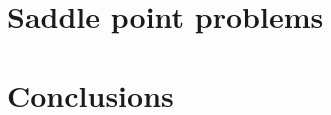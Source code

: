\documentclass{article}
\begin{document}




\section{Saddle point problems}

\section{Conclusions}
\end{document}
